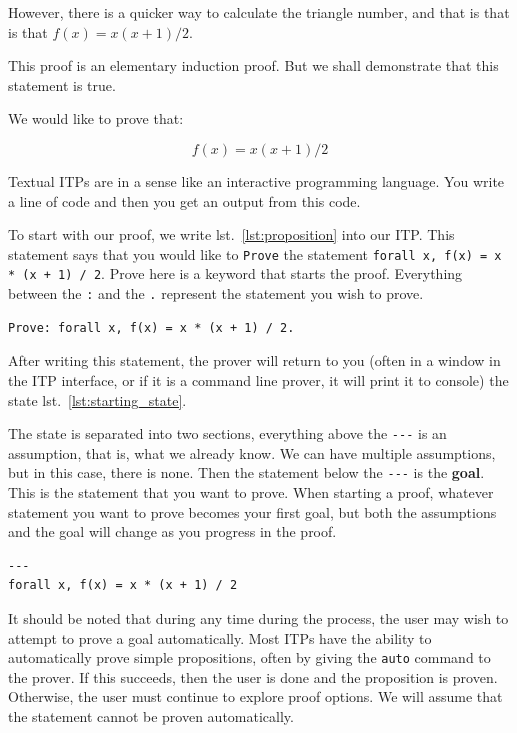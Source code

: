 \documentclass[
]{article}
\newcommand{\passthrough}[1]{#1}
\begin{document}
However, there is a quicker way to calculate the triangle number, and
that is that is that \(f(x) = x(x + 1) / 2\).

This proof is an elementary induction proof. But we shall demonstrate
that this statement is true.

We would like to prove that:

\[ f(x) = x(x + 1)/2 \]

Textual ITPs are in a sense like an interactive programming language.
You write a line of code and then you get an output from this code.

To start with our proof, we write lst.~\ref{lst:proposition} into our
ITP. This statement says that you would like to
\passthrough{\lstinline!Prove!} the statement
\passthrough{\lstinline!forall x, f(x) = x * (x + 1) / 2!}. Prove here
is a keyword that starts the proof. Everything between the
\passthrough{\lstinline!:!} and the \passthrough{\lstinline!.!}
represent the statement you wish to prove.

\begin{lstlisting}[caption={Statement of the proposition you wish to prove}, label=lst:proposition]
Prove: forall x, f(x) = x * (x + 1) / 2.
\end{lstlisting}

After writing this statement, the prover will return to you (often in a
window in the ITP interface, or if it is a command line prover, it will
print it to console) the state lst.~\ref{lst:starting_state}.

The state is separated into two sections, everything above the
\passthrough{\lstinline!---!} is an assumption, that is, what we already
know. We can have multiple assumptions, but in this case, there is none.
Then the statement below the \passthrough{\lstinline!---!} is the
\textbf{goal}. This is the statement that you want to prove. When
starting a proof, whatever statement you want to prove becomes your
first goal, but both the assumptions and the goal will change as you
progress in the proof.

\begin{lstlisting}[caption={Starting state of the prover}, label=lst:starting_state]
---
forall x, f(x) = x * (x + 1) / 2
\end{lstlisting}

It should be noted that during any time during the process, the user may
wish to attempt to prove a goal automatically. Most ITPs have the
ability to automatically prove simple propositions, often by giving the
\passthrough{\lstinline!auto!} command to the prover. If this succeeds,
then the user is done and the proposition is proven. Otherwise, the user
must continue to explore proof options. We will assume that the
statement cannot be proven automatically.
\end{document}

